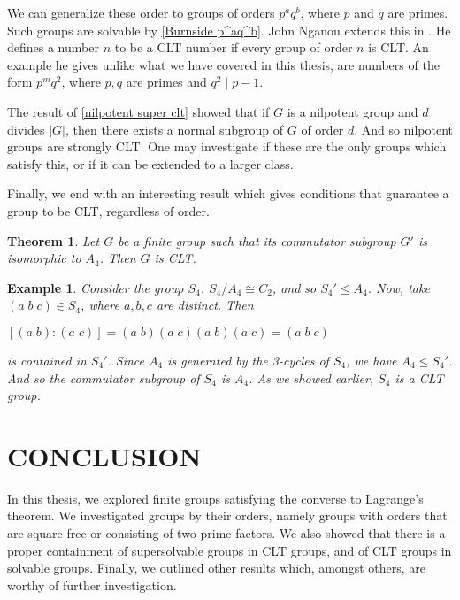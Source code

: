 \documentclass[12pt]{report}
\theoremstyle{newthm}
\newtheorem{Theorem}[lem]{Theorem}
\newtheorem{Example}[lem]{Example}
\begin{document}
We can generalize these order to groups of orders $p^aq^b$, where $p$ and $q$ are primes. Such groups are solvable by \cref{Burnside p^aq^b}. John Nganou extends this in \cite[pg 3]{CLT Numbers}. He defines a number $n$ to be a CLT number if every group of order $n$ is CLT. An example he gives unlike what we have covered in this thesis, are numbers of the form $p^mq^2$, where $p,q$ are primes and $q^2\mid p-1$.

The result of \cref{nilpotent super clt} showed that if $G$ is a nilpotent group and $d$ divides $|G|$, then there exists a normal subgroup of $G$ of order $d$. And so nilpotent groups are strongly CLT. One may investigate if these are the only groups which satisfy this, or if it can be extended to a larger class.


Finally, we end with an interesting result which gives conditions that guarantee a group to be CLT, regardless of order.

\begin{Theorem}\label{commutator} \cite[Theorem 6]{Barry}
Let $G$ be a finite group such that its commutator subgroup $G'$ is isomorphic to $A_4$. Then $G$ is CLT.
\end{Theorem}

\begin{Example}
Consider the group $S_4$. $S_4/A_4\cong C_2$, and so $S_4'\leq A_4$. Now, take $(a\;b\;c)\in S_4$, where $a,b,c$ are distinct. Then \begin{center}$[(a\;b):(a\;c)] = (a\;b)(a\;c)(a\;b)(a\;c)=(a\;b\;c)$\end{center} is contained in $S_4'$. Since $A_4$ is generated by the 3-cycles of $S_4$, we have $A_4\leq S_4'$. And so the commutator subgroup of $S_4$ is $A_4$. As we showed earlier, $S_4$ is a CLT group.
\end{Example}
\newpage


\section{CONCLUSION} In this thesis, we explored finite groups satisfying the converse to Lagrange's theorem. We investigated groups by their orders, namely groups with orders that are square-free or consisting of two prime factors. We also showed that there is a proper containment of supersolvable groups in CLT groups, and of CLT groups in solvable groups. Finally, we outlined other results which, amongst others, are worthy of further investigation.

\newpage
{}
\end{document}
